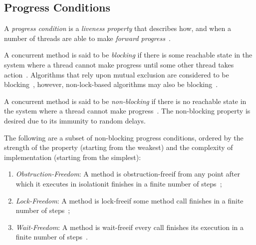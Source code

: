 
\subsection{Progress Conditions}
A \emph{progress condition} is a \emph{liveness property} that describes how,
and when a number of threads are able to make \emph{forward
progress}~\citep[Section~3.2]{scott2013shared}.

A concurrent method is said to be \emph{blocking} if there is some reachable
state in the system where a thread cannot make progress until some other thread
takes action~\citep[Section~3.2]{scott2013shared}. Algorithms that rely upon
mutual exclusion are considered to be
blocking~\citep[Section~3.2]{scott2013shared}, however, non-lock-based
algorithms may also be blocking~\citep{mellor1987concurrent}.

A concurrent method is said to be \emph{non-blocking} if there is no reachable
state in the system where a thread cannot make
progress~\cite[Section~3.2]{scott2013shared}. The non-blocking property is
desired due to its immunity to random delays. %

The following are a subset of non-blocking progress conditions, ordered by the
strength of the property (starting from the weakest) and the complexity of
implementation (starting from the simplest):

\begin{enumerate}
\item \emph{Obstruction-Freedom}: A method is obstruction-free\textemdash if from any
point after which it executes in isolation\textemdash it finishes in a finite number of
steps~\citep[Section~3.8.3]{herlihy2020art};
\item \emph{Lock-Freedom}: A method is lock-free\textemdash if \textemdash some method call finishes
in a finite number of steps~\citep[Section~3.8.2]{herlihy2020art};
\item \emph{Wait-Freedom}: A method is wait-free\textemdash if \textemdash every call finishes its
execution in a finite number of steps~\citep[Section~3.8.1]{herlihy2020art}.
\end{enumerate}

